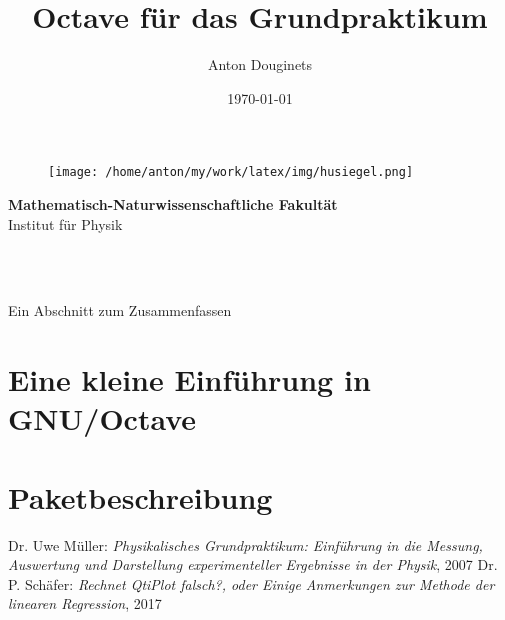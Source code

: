 \documentclass[a4paper,12pt]{article}
\title{Octave für das Grundpraktikum}
\author{Anton Douginets}
\date{\today}
\begin{document}
	\begin{titlepage}
		\thispagestyle{empty}
		\begin{figure}
			\texttt{[image: /home/anton/my/work/latex/img/husiegel.png]}
		\end{figure}
		\vspace*{-30mm}\hspace{-6mm}\textbf{\textcolor{pantone294}{\large{Mathematisch-Naturwissenschaftliche Fakultät}}}\\
		\textcolor{pantone294}{Institut für Physik}\\
		\vspace{20mm}
		\begin{center}
			\textcolor{pantone294}{\huge{\textbf{\thetitle}}}\\\vspace*{10mm}
			\textcolor{pantone294}{\thedate}\\\vspace*{10mm}
		\end{center}
		\tableofcontents

		\vspace{1cm}

		Ein Abschnitt zum Zusammenfassen
	\end{titlepage}
	\makeatother
	\newpage

	\section{Eine kleine Einführung in GNU/Octave}

	\section{Paketbeschreibung}

	\begin{thebibliography}{}
	Dr. Uwe Müller: \textit{Physikalisches Grundpraktikum: Einführung in die Messung, Auswertung und Darstellung experimenteller Ergebnisse in der Physik}, 2007
	 Dr. P. Schäfer: \textit{Rechnet QtiPlot falsch?, oder Einige Anmerkungen zur Methode der linearen Regression}, 2017


	\end{thebibliography}
\end{document}
